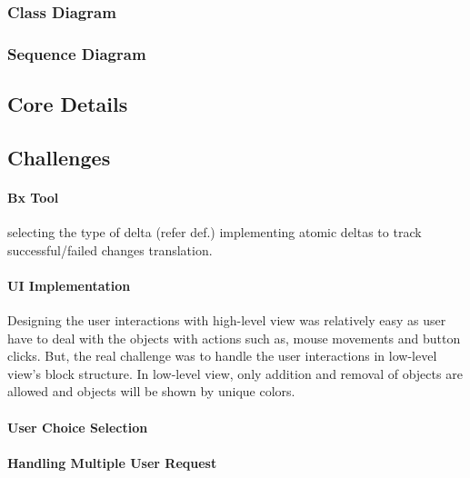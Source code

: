\subsubsection{Class Diagram}\label{subsubsec:classes}
\subsubsection{Sequence Diagram}\label{subsubsec:sequence}

\subsection{Core Details}\label{subsec:coredetails}

\subsection{Challenges}\label{subsec:implchallenges}
\paragraph{Bx Tool}
selecting the type of delta (refer def.)
implementing atomic deltas to track successful/failed changes translation. 

\paragraph{UI Implementation}
Designing the user interactions with high-level view was relatively easy as user have to deal with the objects with actions such as, mouse movements and button clicks. But, the real challenge was to handle the user interactions in low-level view's block structure. In low-level view, only addition and removal of objects are allowed and objects will be shown by unique colors. 

\paragraph{User Choice Selection}

\paragraph{Handling Multiple User Request}
 



